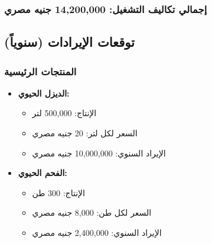 \subsubsection{إجمالي تكاليف التشغيل: 14,200,000 جنيه مصري}

\subsection{توقعات الإيرادات (سنوياً)}

\subsubsection{المنتجات الرئيسية}
\begin{itemize}
    \item \textbf{الديزل الحيوي:}
    \begin{itemize}
        \item الإنتاج: 500,000 لتر
        \item السعر لكل لتر: 20 جنيه مصري
        \item الإيراد السنوي: 10,000,000 جنيه مصري
    \end{itemize}
    
    \item \textbf{الفحم الحيوي:}
    \begin{itemize}
        \item الإنتاج: 300 طن
        \item السعر لكل طن: 8,000 جنيه مصري
        \item الإيراد السنوي: 2,400,000 جنيه مصري
    \end{itemize}
\end{itemize}

